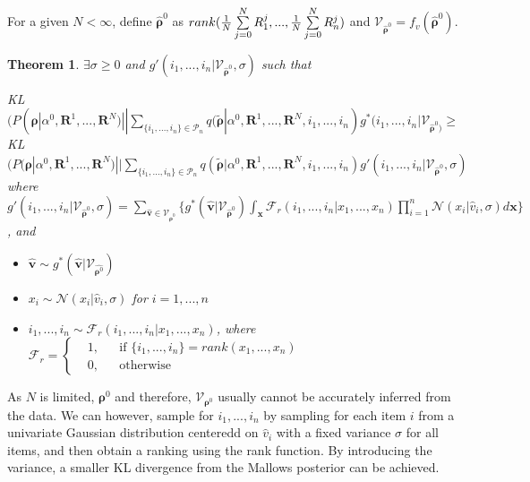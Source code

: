 \documentclass[11pt, oneside]{article}   	%
\newtheorem{theorem}{Theorem}[subsection]
\begin{document}
\subsection{ }
For a given $N < \infty$, define $\hat{\bm{\rho}}^0$ as $rank({1\over N}\sum\limits_{j=0}^{N}R_1^j, ..., {1\over N}\sum\limits_{j=0}^{N}R_n^j)$ and  $\mathcal{V}_{\hat{\bm{\rho}}^0} = f_v(\hat{\bm{\rho}}^0)$. 

\begin{theorem}

$\exists\sigma \geq 0$ and $g'(i_1, ..., i_n|\mathcal{V}_{\hat{\bm{\rho}}^0}, \sigma)$ such that 

 KL $(P(\bm{\rho}|\alpha^0, \bm{R}^1, ...,\bm{R}^N ) || \sum\limits_{\{i_1,..., i_n\} \in \mathcal{P}_n} q (\tilde{\bm{\rho}}|\alpha^0, \bm{R}^1,..., \bm{R}^N, i_1,...,i_n) g^{*}(i_1,...,i_n|\mathcal{V}_{\hat{\bm{\rho}}^0)}\geq $\\
 KL $(P(\bm{\rho}|\alpha^0, \bm{R}^1, ...,\bm{R}^N ) || \sum\limits_{\{i_1,..., i_n\} \in \mathcal{P}_n} q (\tilde{\bm{\rho}}|\alpha^0, \bm{R}^1,..., \bm{R}^N, i_1,...,i_n) g'(i_1,...,i_n|\mathcal{V}_{\hat{\bm{\rho}}^0}, \sigma)$\\

 where 
 $g'(i_1, ..., i_n|\mathcal{V}_{\hat{\bm{\rho}}^0}, \sigma) = \sum\limits_{\hat{\bm{v}}\in \mathcal{V}_{\hat{\bm{\rho}}^0}}\{ g^* (\hat{\bm{v}}|\mathcal{V}_{\hat{\bm{\rho}}^{0}}) \int_{\bm{x}}\mathcal{F}_r(i_1,..., i_n|x_1, ...,x_n)\prod\limits_{i=1}^{n}\mathcal{N}(x_i|\hat{v}_i, \sigma)d\bm{x}\}$,
 and
 
 \begin{itemize}
 	\item {$\hat{\bm{v}} \sim g^* (\hat{\bm{v}}|\mathcal{V}_{\hat{\bm{\rho}^{0}}})$}
  	\item {$x_i\sim \mathcal{N}(x_i|\hat{v}_i, \sigma)$} for $i = 1,...,n $
 	\item {$i_1, ..., i_n \sim \mathcal{F}_r(i_1, ..., i_n|x_1, ..., x_n)$}, where $
 	\mathcal{F}_r = \left \{
 	\begin{aligned}
 	&1, && \text{if } \{i_1, ..., i_n\} = rank(x_1, ..., x_n) \\
 	&0, && \text{otherwise}
 	\end{aligned} \right.
 	$
 
 \end{itemize}
 	
\end{theorem} 
As $N$ is limited, $\bm{\rho}^0$ and therefore, $\mathcal{V}_{\bm{\rho}^0}$ usually cannot be accurately inferred from the data. We can however, sample for $i_1, ..., i_n$ by sampling for each item $i$ from a univariate Gaussian distribution centeredd on $\hat{v}_i$ with a fixed variance $\sigma$ for all items, and then obtain a ranking using the rank function. By introducing the variance, a smaller KL divergence from the Mallows posterior can be achieved.
 
\end{document}
